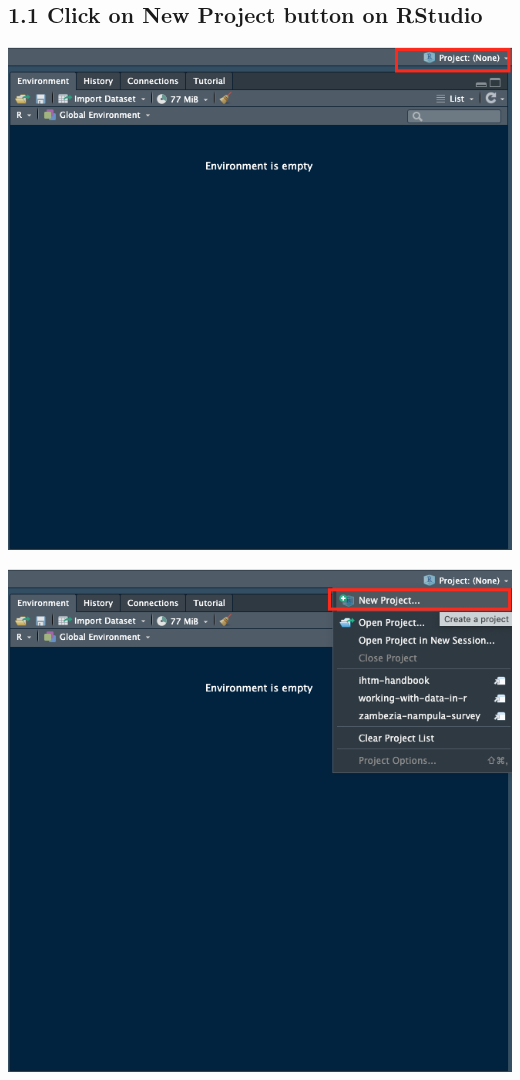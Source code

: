 \documentclass[
  12pt,
]{book}
\begin{document}
\hypertarget{click-on-new-project-button-on-rstudio}{%
\subsection{\texorpdfstring{1.1 Click on \textbf{New Project} button on RStudio}{1.1 Click on New Project button on RStudio}}\label{click-on-new-project-button-on-rstudio}}

\includegraphics{images/new_project1.png}

\includegraphics{images/new_project2.png}
\end{document}
